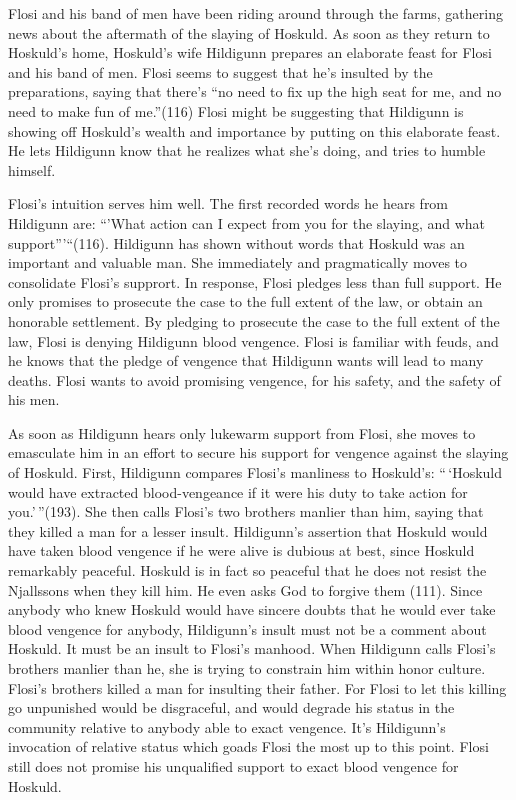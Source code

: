 Flosi and his band of men have been riding around through the farms,
gathering news about the aftermath of the slaying of Hoskuld. As soon as
they return to Hoskuld's home, Hoskuld's wife Hildigunn prepares an
elaborate feast for Flosi and his band of men. Flosi seems to suggest
that he's insulted by the preparations, saying that there's ``no need to
fix up the high seat for me, and no need to make fun of me.''(116) Flosi
might be suggesting that Hildigunn is showing off Hoskuld's wealth and
importance by putting on this elaborate feast. He lets Hildigunn know
that he realizes what she's doing, and tries to humble himself.

Flosi's intuition serves him well. The first recorded words he hears
from Hildigunn are: ``'What action can I expect from you for the
slaying, and what support'''``(116). Hildigunn has shown without words
that Hoskuld was an important and valuable man. She immediately and
pragmatically moves to consolidate Flosi's supprort. In response, Flosi
pledges less than full support. He only promises to prosecute the case
to the full extent of the law, or obtain an honorable settlement. By
pledging to prosecute the case to the full extent of the law, Flosi is
denying Hildigunn blood vengence. Flosi is familiar with feuds, and he
knows that the pledge of vengence that Hildigunn wants will lead to many
deaths. Flosi wants to avoid promising vengence, for his safety, and the
safety of his men.

As soon as Hildigunn hears only lukewarm support from Flosi, she moves
to emasculate him in an effort to secure his support for vengence
against the slaying of Hoskuld. First, Hildigunn compares Flosi's
manliness to Hoskuld's: ``\,`Hoskuld would have extracted
blood-vengeance if it were his duty to take action for you.'\,''(193).
She then calls Flosi's two brothers manlier than him, saying that they
killed a man for a lesser insult. Hildigunn's assertion that Hoskuld
would have taken blood vengence if he were alive is dubious at best,
since Hoskuld remarkably peaceful. Hoskuld is in fact so peaceful that
he does not resist the Njallssons when they kill him. He even asks God
to forgive them (111). Since anybody who knew Hoskuld would have sincere
doubts that he would ever take blood vengence for anybody, Hildigunn's
insult must not be a comment about Hoskuld. It must be an insult to
Flosi's manhood. When Hildigunn calls Flosi's brothers manlier than he,
she is trying to constrain him within honor culture. Flosi's brothers
killed a man for insulting their father. For Flosi to let this killing
go unpunished would be disgraceful, and would degrade his status in the
community relative to anybody able to exact vengence. It's Hildigunn's
invocation of relative status which goads Flosi the most up to this
point. Flosi still does not promise his unqualified support to exact
blood vengence for Hoskuld.

